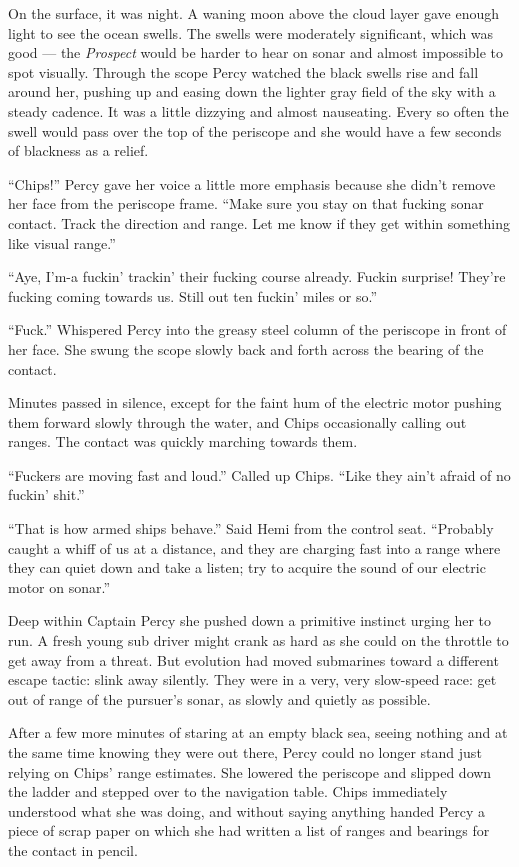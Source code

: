 \documentclass[
]{scrbook}
\begin{document}
On the surface, it was night. A waning moon above the cloud layer gave
enough light to see the ocean swells. The swells were moderately
significant, which was good --- the \emph{Prospect} would be harder to
hear on sonar and almost impossible to spot visually. Through the scope
Percy watched the black swells rise and fall around her, pushing up and
easing down the lighter gray field of the sky with a steady cadence. It
was a little dizzying and almost nauseating. Every so often the swell
would pass over the top of the periscope and she would have a few
seconds of blackness as a relief.

``Chips!'' Percy gave her voice a little more emphasis because she
didn't remove her face from the periscope frame. ``Make sure you stay on
that fucking sonar contact. Track the direction and range. Let me know
if they get within something like visual range.''

``Aye, I'm-a fuckin' trackin' their fucking course already. Fuckin
surprise! They're fucking coming towards us. Still out ten fuckin' miles
or so.''

``Fuck.'' Whispered Percy into the greasy steel column of the periscope
in front of her face. She swung the scope slowly back and forth across
the bearing of the contact.

Minutes passed in silence, except for the faint hum of the electric
motor pushing them forward slowly through the water, and Chips
occasionally calling out ranges. The contact was quickly marching
towards them.

``Fuckers are moving fast and loud.'' Called up Chips. ``Like they ain't
afraid of no fuckin' shit.''

``That is how armed ships behave.'' Said Hemi from the control seat.
``Probably caught a whiff of us at a distance, and they are charging
fast into a range where they can quiet down and take a listen; try to
acquire the sound of our electric motor on sonar.''

Deep within Captain Percy she pushed down a primitive instinct urging
her to run. A fresh young sub driver might crank as hard as she could on
the throttle to get away from a threat. But evolution had moved
submarines toward a different escape tactic: slink away silently. They
were in a very, very slow-speed race: get out of range of the pursuer's
sonar, as slowly and quietly as possible.

After a few more minutes of staring at an empty black sea, seeing
nothing and at the same time knowing they were out there, Percy could no
longer stand just relying on Chips' range estimates. She lowered the
periscope and slipped down the ladder and stepped over to the navigation
table. Chips immediately understood what she was doing, and without
saying anything handed Percy a piece of scrap paper on which she had
written a list of ranges and bearings for the contact in pencil.
\end{document}
